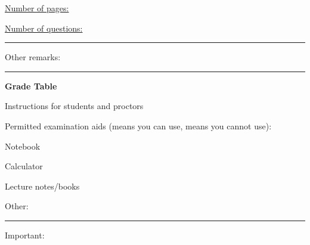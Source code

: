 \begin{coverpages}
\begin{doublespace}
        \noindent{}

        \noindent\uline{Number of pages: \numpages \hfill}

        \noindent\uline{Number of questions: \numquestions \hfill}

        \noindent\parbox{\textwidth}{\singlespacing \@qdescription}
        \vspace{2pt}\hrule
        \noindent\parbox{\textwidth}{\singlespacing Other remarks: \@oremarks}
        \vspace{2pt}\hrule
    \end{doublespace}

    \begin{center}
        \Large \textbf{Grade Table}\\[3mm]
        \normalsize\gradetable[h][questions]
    \end{center}

    \vspace{1cm}

    \noindent\huge Instructions for students and proctors

    \noindent\normalsize Permitted examination aids (\done means you can use, \wontfix means you cannot use):

    \begin{todolist}[topsep=0pt]
        \setlength\itemsep{0em}
        \item[\wontfix] Notebook
        \item[\done] Calculator
        \item[\wontfix] Lecture notes/books
        \item[\wontfix] Other:
    \end{todolist}

    \noindent\textcolor{red}{\rule{\textwidth}{2pt}}
    \vspace{1mm}

    \begin{minipage}{0.48\textwidth}
        \begin{flushleft}
            \footnotesize
            Important:


\end{flushleft}
\end{minipage}
\end{coverpages}
